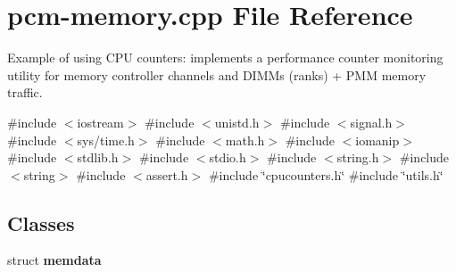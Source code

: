 \section{pcm-\/memory.cpp File Reference}
\label{pcm-memory_8cpp}


Example of using C\+PU counters\+: implements a performance counter monitoring utility for memory controller channels and D\+I\+M\+Ms (ranks) + P\+MM memory traffic.  


{\ttfamily \#include $<$iostream$>$}\newline
{\ttfamily \#include $<$unistd.\+h$>$}\newline
{\ttfamily \#include $<$signal.\+h$>$}\newline
{\ttfamily \#include $<$sys/time.\+h$>$}\newline
{\ttfamily \#include $<$math.\+h$>$}\newline
{\ttfamily \#include $<$iomanip$>$}\newline
{\ttfamily \#include $<$stdlib.\+h$>$}\newline
{\ttfamily \#include $<$stdio.\+h$>$}\newline
{\ttfamily \#include $<$string.\+h$>$}\newline
{\ttfamily \#include $<$string$>$}\newline
{\ttfamily \#include $<$assert.\+h$>$}\newline
{\ttfamily \#include \char`\"{}cpucounters.\+h\char`\"{}}\newline
{\ttfamily \#include \char`\"{}utils.\+h\char`\"{}}\newline
\subsection*{Classes}
\begin{DoxyCompactItemize}
\item 
struct \textbf{ memdata}
\end{DoxyCompactItemize}

